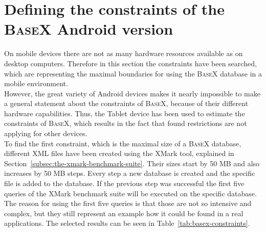 \section{Defining the constraints of the \textsc{BaseX} Android version}
\label{sec:defining-the-constraints}
On mobile devices there are not as many hardware resources available as on desktop computers.
Therefore in this section the constraints have been searched, which are representing the maximal boundaries for using the \textsc{BaseX} database in a mobile environment.\\
However, the great variety of Android devices makes it nearly impossible to make a general statement about the constraints of \textsc{BaseX}, because of their different hardware capabilities.
Thus, the Tablet device has been used to estimate the constraints of \textsc{BaseX}, which results in the fact that found restrictions are not applying for other devices.\\
To find the first constraint, which is the maximal size of a \textsc{BaseX} database, different XML files have been created using the XMark tool, explained in Section~\ref{subsec:the-xmark-benchmark-suite}.
Their sizes start by 50 MB and also increases by 50 MB steps.
Every step a new database is created and the specific file is added to the database.
If the previous step was successful the first five queries of the XMark benchmark suite will be executed on the specific database.
The reason for using the first five queries is that those are not so intensive and complex, but they still represent an example how it could be found in a real applications.
The selected results can be seen in Table~\ref{tab:basex-constraints}.

